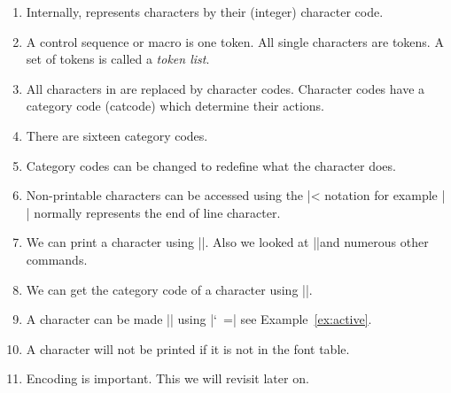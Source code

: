 \begin{enumerate}
\item Internally, \tex represents characters by their (integer) character code.
\item A control sequence or macro is one token. All single characters are tokens. A set of tokens is called a \emph{token list}.
\item All characters in \tex are replaced by character codes. Character codes have a category code (catcode) which determine their actions.
\item There are sixteen category codes.
\item Category codes can be changed to redefine what the character does.
\item Non-printable characters can be accessed using the |^^| notation for example |^^M| normally represents the end of line character. 
\item We can print a character using |\char|. Also we looked at |\chardef|and numerous other commands.
\item We can get the category code of a character using |\the\catcode|.
\item A character can be made |\active| using |\catcode `~=\active| see Example~\ref{ex:active}. 
\item A character will not be printed if it is not in the font table.
\item Encoding is important. This we will revisit later on.
\end{enumerate}

